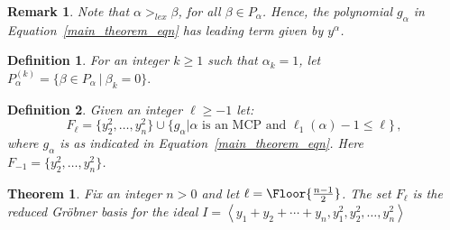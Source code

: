 \documentclass[10pt,a4paper]{article}
\newtheorem{definition}{Definition}[section]
\newtheorem{theorem}{Theorem}[section]
\newtheorem{remark}{Remark}[section]
\DeclarePairedDelimiter\Floor\lfloor\rfloor
\DeclareMathOperator{\la}{\langle}
\DeclareMathOperator{\ra}{\rangle}
\begin{document}
\begin{remark}\label{rem:lex}
	Note that $\alpha >_{lex} \beta$, for all  $ \beta \in P_{\alpha}$. Hence, the polynomial $g_\alpha$ in Equation~\eqref{main_theorem_eqn} has leading term given by $y^\alpha$.
\end{remark}
\begin{definition} \label{p_alpha_k}
	For an integer $k \geq 1$ such that $\alpha_k=1$, let
		$P_\alpha^{(k)} = \big\{\beta  \in P_\alpha \ | \ \beta_k = 0\big\}.$
\end{definition}
\begin{definition} \label{F_ell}
	Given an integer $\ell \ge -1$ let:
	\begin{equation*}
		F_\ell = \big\{ y^2_2, \dots, y^2_n\big\} \cup \big\{ g_{\alpha} \big|  \alpha \text{ is an MCP and } \ell_1(\alpha)-1 \leq \ell \big\} \,,
	\end{equation*}
	where $g_\alpha$ is as indicated in Equation~\eqref{main_theorem_eqn}. Here $F_{-1}= \big\{ y^2_2, \dots, y^2_n\big\}$.
\end{definition}
\begin{theorem} 
\label{main_theorem2}
    Fix an integer $n>0$ and let $\ell = \Floor{\frac{n-1}{2}}$. The set $F_\ell$ is the reduced Gr\"obner basis for the ideal $I = \la y_1 + y_2 + \cdots + y_n, y_1^2, y_2^2, \dots, y_n^2 \ra$
    \end{theorem}

\end{document}
